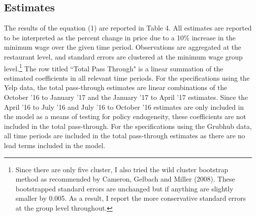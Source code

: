 \documentclass[11pt]{article}
\begin{document}
\subsection{Estimates}

The results of the equation (1) are reported in Table 4. All estimates are reported to be  interpreted as the percent change in price due to a 10\% increase in the minimum wage over the given time period. Observations are aggregated at the restaurant level, and standard errors are clustered at the minimum wage group level.\footnote{Since there are only five cluster, I also tried the wild cluster bootstrap method as recommended by Cameron, Gelbach and Miller (2008)\nocite{cameron2008bootstrap}. These bootstrapped standard errors are unchanged but if anything are slightly smaller by 0.005. As a result, I report the more conservative standard errors at the group level throughout.} The row titled ``Total Pass Through" is a linear summation of the estimated coefficients in all relevant time periods. For the specifications using the Yelp data, the total pass-through estimates are linear combinations of the October '16 to January '17 and the January '17 to April '17 estimates. Since the April '16 to July '16 and July '16 to October '16 estimates are only included in the model as a means of testing for policy endogeneity, these coefficients are not included in the total pass-through. For the specifications using the Grubhub data, all time periods are included in the total pass-through estimates as there are no lead terms included in the model. 
\end{document}
